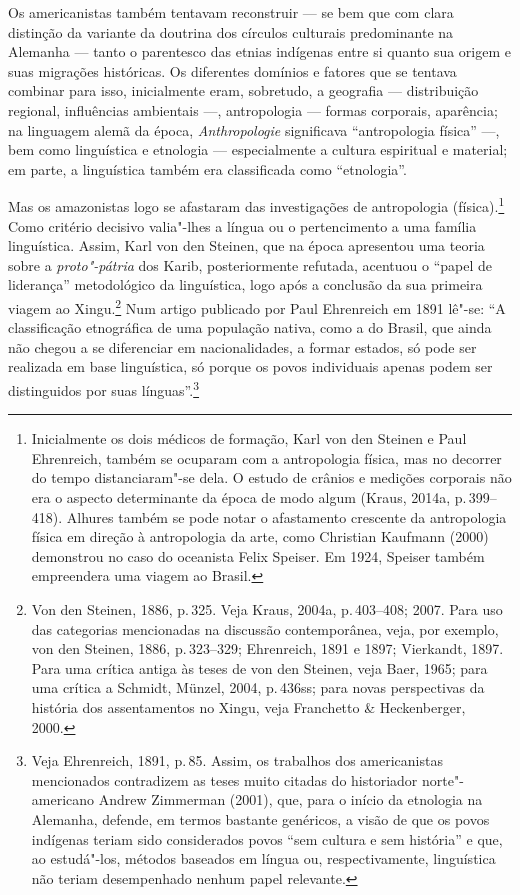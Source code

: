 Os americanistas também tentavam reconstruir --- se bem que com clara
distinção da variante da doutrina dos círculos culturais predominante na
Alemanha --- tanto o parentesco das etnias indígenas entre si quanto sua
origem e suas migrações históricas. Os diferentes domínios e fatores que
se tentava combinar para isso, inicialmente eram, sobretudo, a
geografia --- distribuição regional, influências ambientais ---, antropologia --- formas corporais, aparência; na linguagem alemã da época,
\textit{Anthropologie} significava ``antropologia física'' ---,
bem como linguística e etnologia --- especialmente a
cultura espiritual e material; em parte, a linguística também era
classificada como ``etnologia''.

Mas os amazonistas logo se afastaram das investigações de antropologia
(física).\footnote{Inicialmente os dois médicos de formação, Karl von
  den Steinen e Paul Ehrenreich, também se ocuparam com a antropologia
  física, mas no decorrer do tempo distanciaram"-se dela. O estudo de
  crânios e medições corporais não era o aspecto determinante da época
  de modo algum (Kraus, 2014a, p.\,399--418). Alhures também se pode notar
  o afastamento crescente da antropologia física em direção à
  antropologia da arte, como Christian Kaufmann (2000) demonstrou no
  caso do oceanista Felix Speiser. Em 1924, Speiser também
  empreendera uma viagem ao Brasil.} Como critério decisivo valia"-lhes a
língua ou o pertencimento a uma família linguística. Assim, Karl von den
Steinen, que na época apresentou uma teoria sobre a \textit{proto"-pátria} dos Karib, posteriormente refutada, acentuou o
``papel de liderança'' metodológico da linguística, logo após a
conclusão da sua primeira viagem ao Xingu.\footnote{Von den Steinen,
  1886, p.\,325. Veja Kraus, 2004a, p.\,403--408; 2007. Para uso das
  categorias mencionadas na discussão contemporânea, veja, por exemplo,
  von den Steinen, 1886, p.\,323--329; Ehrenreich, 1891 e 1897; Vierkandt,
  1897. Para uma crítica antiga às teses de von den Steinen, veja Baer,
  1965; para uma crítica a Schmidt, Münzel, 2004, p.\,436ss; para
  novas perspectivas da história dos assentamentos no Xingu, veja
  Franchetto \& Heckenberger, 2000.} Num artigo publicado por Paul
Ehrenreich em 1891 lê"-se: ``A classificação etnográfica de uma população
nativa, como a do Brasil, que ainda não chegou a se diferenciar em
nacionalidades, a formar estados, só pode ser realizada em base
linguística, só porque os povos individuais apenas podem ser
distinguidos por suas línguas''.\footnote{Veja Ehrenreich, 1891, p.\,85. Assim,
  os trabalhos dos americanistas mencionados contradizem as teses muito
  citadas do historiador norte"-americano Andrew Zimmerman (2001), que,
  para o início da etnologia na Alemanha, defende, em termos bastante
  genéricos, a visão de que os povos indígenas teriam sido considerados
  povos ``sem cultura e sem história'' e que, ao estudá"-los, métodos
  baseados em língua ou, respectivamente, linguística não teriam
  desempenhado nenhum papel relevante.}

